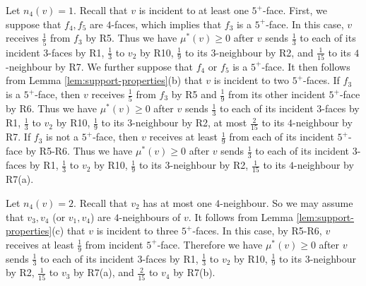 \documentclass[12pt, reqno]{amsart}
\theoremstyle{plain}
\theoremstyle{definition}
\numberwithin{equation}{section}
\begin{document}
Let $n_4(v)=1$.  Recall that $v$ is incident to at least one $5^+$-face. 
First, we suppose that $f_4,f_5$ are $4$-faces, which implies that  $f_3$ is a $5^+$-face. In this case, $v$ receives $\frac{1}{5}$ from $f_3$ by R5.  Thus we have  $\mu^*(v)\geq 0$  after $v$ sends $\frac{1}{3}$ to each of its incident $3$-faces by R1, $\frac{1}{3}$ to $v_2$ by R10, $\frac{1}{9}$ to its $3$-neighbour by R2, and $\frac{1}{15}$ to its $4$-neighbour by R7. We further suppose that  $f_4$ or $f_5$ is a $5^+$-face. It then follows from Lemma \ref{lem:support-properties}(b) that $v$ is incident to two $5^+$-faces. 
If $f_3$ is a $5^+$-face, then $v$ receives $\frac{1}{5}$ from $f_3$ by R5 and  $\frac{1}{9}$ from its other incident $5^+$-face by R6.  Thus we have  $\mu^*(v)\geq 0$  after $v$ sends $\frac{1}{3}$ to each of its incident $3$-faces by R1, $\frac{1}{3}$ to $v_2$ by R10, $\frac{1}{9}$ to its $3$-neighbour by R2, at most $\frac{2}{15}$ to its $4$-neighbour by R7. 
If $f_3$ is not a $5^+$-face, then $v$ receives at least $\frac{1}{9}$ from each of its incident $5^+$-face by R5-R6.  Thus we have  $\mu^*(v)\geq 0$  after $v$ sends $\frac{1}{3}$ to each of its incident $3$-faces by R1, $\frac{1}{3}$ to $v_2$ by R10, $\frac{1}{9}$ to its $3$-neighbour by R2, $\frac{1}{15}$ to its $4$-neighbour by R7(a).



Let $n_4(v)=2$. Recall that $v_2$ has at most one $4$-neighbour. So we may assume that $v_3,v_4$ (or $v_1,v_4$) are $4$-neighbours of $v$. It follows from Lemma \ref{lem:support-properties}(c) that  $v$ is incident to three $5^+$-faces. In this case, by R5-R6, $v$ receives at least $\frac{1}{9}$ from  incident $5^+$-face. Therefore we have  $\mu^*(v)\geq 0$  after $v$ sends $\frac{1}{3}$ to each of its incident $3$-faces by R1, $\frac{1}{3}$ to $v_2$ by R10, $\frac{1}{9}$ to its $3$-neighbour by R2, $\frac{1}{15}$ to $v_3$ by R7(a), and  $\frac{2}{15}$ to $v_4$ by R7(b).\medskip



\end{document}
